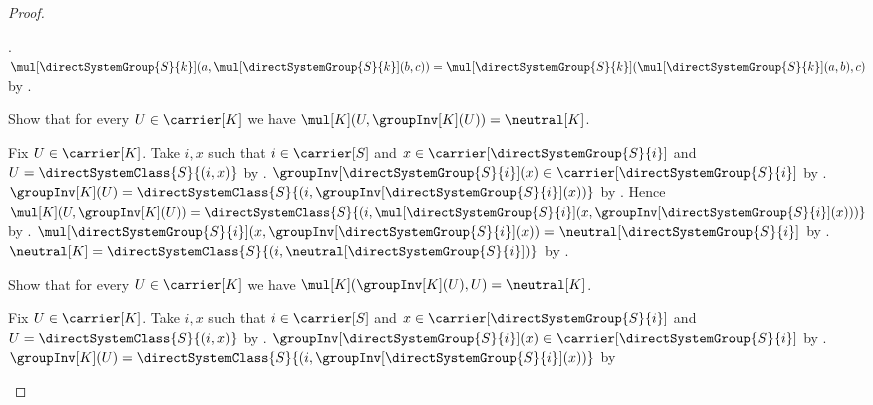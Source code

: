 \begin{proof}
\begin{subproof}
            .
        $\mul[\directSystemGroup{S}{k}]
            (a,\mul[\directSystemGroup{S}{k}](b,c))
            =\mul[\directSystemGroup{S}{k}]
                (\mul[\directSystemGroup{S}{k}](a,b),c)$ by
            .
    \end{subproof}
    Show that for every $U\in\carrier[K]$ we have
        $\mul[K](U,\groupInv[K](U))=\neutral[K]$.
    \begin{subproof}
        Fix $U\in\carrier[K]$.
        Take $i,x$ such that $i\in\carrier[S]$ and
            $x\in\carrier[\directSystemGroup{S}{i}]$ and
            $U=\directSystemClass{S}{(i,x)}$ by
            .
        $\groupInv[\directSystemGroup{S}{i}](x)\in
            \carrier[\directSystemGroup{S}{i}]$ by
            .
        $\groupInv[K](U)=\directSystemClass{S}
            {(i,\groupInv[\directSystemGroup{S}{i}](x))}$ by
            .
        Hence $\mul[K](U,\groupInv[K](U))=
            \directSystemClass{S}
                {(i,\mul[\directSystemGroup{S}{i}]
                    (x,\groupInv[\directSystemGroup{S}{i}](x)))}$ by
            .
        $\mul[\directSystemGroup{S}{i}]
            (x,\groupInv[\directSystemGroup{S}{i}](x))
            =\neutral[\directSystemGroup{S}{i}]$ by
            .
        $\neutral[K]=\directSystemClass{S}
            {(i,\neutral[\directSystemGroup{S}{i}])}$ by
            .
    \end{subproof}
    Show that for every $U\in\carrier[K]$ we have
        $\mul[K](\groupInv[K](U),U)=\neutral[K]$.
    \begin{subproof}
        Fix $U\in\carrier[K]$.
        Take $i,x$ such that $i\in\carrier[S]$ and
            $x\in\carrier[\directSystemGroup{S}{i}]$ and
            $U=\directSystemClass{S}{(i,x)}$ by
            .
        $\groupInv[\directSystemGroup{S}{i}](x)\in
            \carrier[\directSystemGroup{S}{i}]$ by
            .
        $\groupInv[K](U)=\directSystemClass{S}
            {(i,\groupInv[\directSystemGroup{S}{i}](x))}$ by

\end{subproof}
\end{proof}
